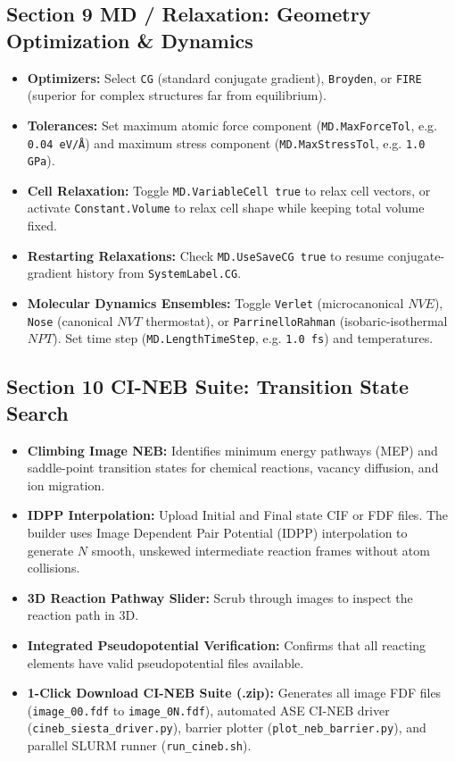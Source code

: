 \documentclass[11pt,a4paper]{article}
\begin{document}
\subsection{Section 9 MD / Relaxation: Geometry Optimization \& Dynamics}
\begin{itemize}[leftmargin=*]
 \item \textbf{Optimizers:} Select \texttt{CG} (standard conjugate gradient), \texttt{Broyden}, or \texttt{FIRE} (superior for complex structures far from equilibrium).
 \item \textbf{Tolerances:} Set maximum atomic force component (\texttt{MD.MaxForceTol}, e.g. \texttt{0.04 eV/\AA}) and maximum stress component (\texttt{MD.MaxStressTol}, e.g. \texttt{1.0 GPa}).
 \item \textbf{Cell Relaxation:} Toggle \texttt{MD.VariableCell true} to relax cell vectors, or activate \texttt{Constant.Volume} to relax cell shape while keeping total volume fixed.
 \item \textbf{Restarting Relaxations:} Check \texttt{MD.UseSaveCG true} to resume conjugate-gradient history from \texttt{SystemLabel.CG}.
 \item \textbf{Molecular Dynamics Ensembles:} Toggle \texttt{Verlet} (microcanonical $NVE$), \texttt{Nose} (canonical $NVT$ thermostat), or \texttt{ParrinelloRahman} (isobaric-isothermal $NPT$). Set time step (\texttt{MD.LengthTimeStep}, e.g. \texttt{1.0 fs}) and temperatures.
\end{itemize}

\subsection{Section 10 CI-NEB Suite: Transition State Search}
\begin{itemize}[leftmargin=*]
 \item \textbf{Climbing Image NEB:} Identifies minimum energy pathways (MEP) and saddle-point transition states for chemical reactions, vacancy diffusion, and ion migration.
 \item \textbf{IDPP Interpolation:} Upload Initial and Final state CIF or FDF files. The builder uses Image Dependent Pair Potential (IDPP) interpolation to generate $N$ smooth, unskewed intermediate reaction frames without atom collisions.
 \item \textbf{3D Reaction Pathway Slider:} Scrub through images to inspect the reaction path in 3D.
 \item \textbf{Integrated Pseudopotential Verification:} Confirms that all reacting elements have valid pseudopotential files available.
 \item \textbf{1-Click Download CI-NEB Suite (.zip):} Generates all image FDF files (\texttt{image\_00.fdf} to \texttt{image\_0N.fdf}), automated ASE CI-NEB driver (\texttt{cineb\_siesta\_driver.py}), barrier plotter (\texttt{plot\_neb\_barrier.py}), and parallel SLURM runner (\texttt{run\_cineb.sh}).
\end{itemize}
\end{document}
